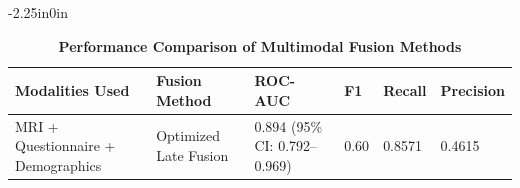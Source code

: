 \documentclass[10pt,letterpaper]{article}
\begin{document}
                                                                                                                          \begin{table}[!t]
                                                                                                                          \begin{adjustwidth}{-2.25in}{0in}
                                                                                                                          \centering
                                                                                                                          \caption{\textbf{Performance Comparison of Multimodal Fusion Methods}}
                                                                                                                          \label{tab:fusion_results}
                                                                                                                          \footnotesize
                                                                                                                          \renewcommand{\arraystretch}{1.15}

                                                                                                                          \begin{tabular}{|p{3.0cm}|p{3.0cm}|p{2.0cm}|p{2.0cm}|p{2.0cm}|p{2.0cm}|}
                                                                                                                          \hline
                                                                                                                          \textbf{Modalities Used} & \textbf{Fusion Method} & \textbf{ROC-AUC} & \textbf{F1} & \textbf{Recall} & \textbf{Precision} \\
                                                                                                                          \hline

                                                                                                                          MRI + Questionnaire + Demographics
                                                                                                                          & Optimized Late Fusion
                                                                                                                          & 0.894 (95\% CI: 0.792--0.969)
                                                                                                                          & 0.60
                                                                                                                          & 0.8571
                                                                                                                          & 0.4615 \\
                                                                                                                          \hline


\end{tabular}
\end{adjustwidth}
\end{table}
\end{document}
